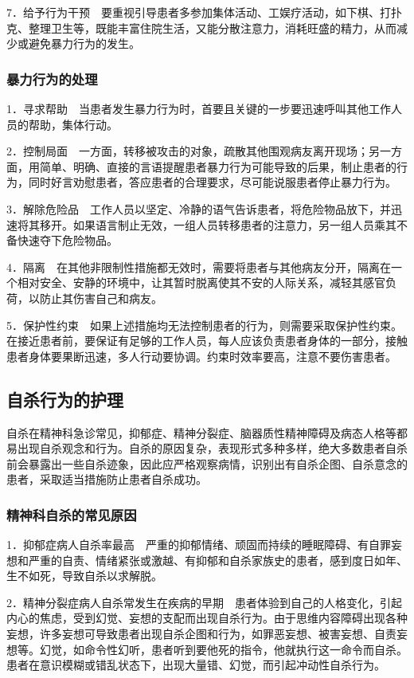 7．给予行为干预　要重视引导患者多参加集体活动、工娱疗活动，如下棋、打扑克、整理卫生等，既能丰富住院生活，又能分散注意力，消耗旺盛的精力，从而减少或避免暴力行为的发生。

\subsubsection{暴力行为的处理}

1．寻求帮助　当患者发生暴力行为时，首要且关键的一步要迅速呼叫其他工作人员的帮助，集体行动。

2．控制局面　一方面，转移被攻击的对象，疏散其他围观病友离开现场；另一方面，用简单、明确、直接的言语提醒患者暴力行为可能导致的后果，制止患者的行为，同时好言劝慰患者，答应患者的合理要求，尽可能说服患者停止暴力行为。

3．解除危险品　工作人员以坚定、冷静的语气告诉患者，将危险物品放下，并迅速将其移开。如果语言制止无效，一组人员转移患者的注意力，另一组人员乘其不备快速夺下危险物品。

4．隔离　在其他非限制性措施都无效时，需要将患者与其他病友分开，隔离在一个相对安全、安静的环境中，让其暂时脱离使其不安的人际关系，减轻其感官负荷，以防止其伤害自己和病友。

5．保护性约束　如果上述措施均无法控制患者的行为，则需要采取保护性约束。在接近患者前，要保证有足够的工作人员，每人应该负责患者身体的一部分，接触患者身体要果断迅速，多人行动要协调。约束时效率要高，注意不要伤害患者。

\subsection{自杀行为的护理}

自杀在精神科急诊常见，抑郁症、精神分裂症、脑器质性精神障碍及病态人格等都易出现自杀观念和行为。自杀的原因复杂，表现形式多种多样，绝大多数患者自杀前会暴露出一些自杀迹象，因此应严格观察病情，识别出有自杀企图、自杀意念的患者，采取适当措施防止患者自杀成功。

\subsubsection{精神科自杀的常见原因}

1．抑郁症病人自杀率最高　严重的抑郁情绪、顽固而持续的睡眠障碍、有自罪妄想和严重的自责、情绪紧张或激越、有抑郁和自杀家族史的患者，感到度日如年、生不如死，导致自杀以求解脱。

2．精神分裂症病人自杀常发生在疾病的早期　患者体验到自己的人格变化，引起内心的焦虑，受到幻觉、妄想的支配而出现自杀行为。由于思维内容障碍出现各种妄想，许多妄想可导致患者出现自杀企图和行为，如罪恶妄想、被害妄想、自责妄想等。幻觉，如命令性幻听，患者听到要他死的指令，他就执行这一命令而自杀。患者在意识模糊或错乱状态下，出现大量错、幻觉，而引起冲动性自杀行为。

